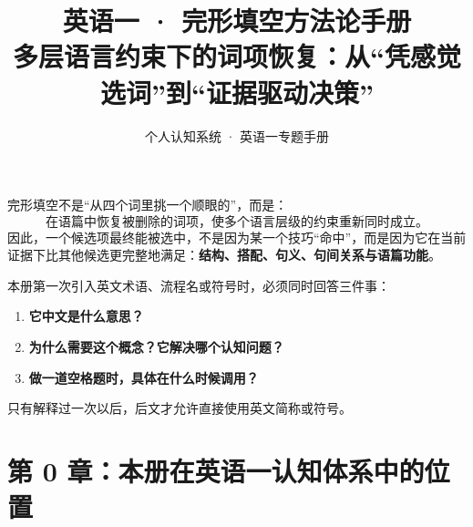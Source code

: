 \documentclass[11pt,a4paper]{ctexart}
\title{\vspace{-1.15cm}\textbf{英语一 · 完形填空方法论手册}\\[0.35em]
\large 多层语言约束下的词项恢复：从“凭感觉选词”到“证据驱动决策”}
\author{个人认知系统 · 英语一专题手册}
\date{}
\newcommand{\kw}[1]{\textbf{#1}}
\begin{document}
\maketitle

\begin{corebox}[一句话母模型]
完形填空不是“从四个词里挑一个顺眼的”，而是：
\[
\boxed{\textbf{在语篇中恢复被删除的词项，使多个语言层级的约束重新同时成立。}}
\]
因此，一个候选项最终能被选中，不是因为某一个技巧“命中”，而是因为它在当前证据下比其他候选更完整地满足：\kw{结构、搭配、句义、句间关系与语篇功能}。
\end{corebox}

\begin{warn}[本册的术语规则]
本册第一次引入英文术语、流程名或符号时，必须同时回答三件事：
\begin{enumerate}
  \item \kw{它中文是什么意思？}
  \item \kw{为什么需要这个概念？它解决哪个认知问题？}
  \item \kw{做一道空格题时，具体在什么时候调用？}
\end{enumerate}
只有解释过一次以后，后文才允许直接使用英文简称或符号。
\end{warn}

\tableofcontents
\newpage

\section{第 0 章：本册在英语一认知体系中的位置}
\end{document}
